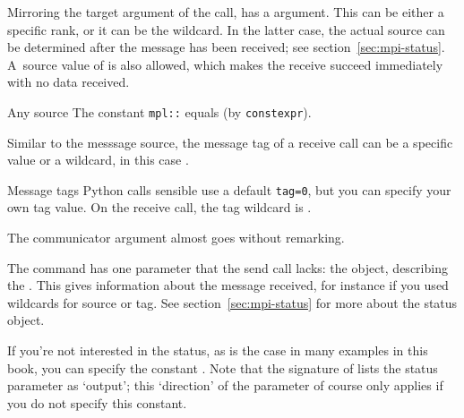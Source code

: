 Mirroring the target argument of the  call,
 has a 
argument.
This can be either a specific rank, or it can be the
 wildcard. In the latter case, the actual
source can be determined after the message has been received;
see section~\ref{sec:mpi-status}.
A~source value of  is also allowed,
which makes the receive succeed immediately with no data received.

\begin{mplnote}{Any source}
  The constant \lstinline+mpl::+
  equals  (by \lstinline+constexpr+).
\end{mplnote}

Similar to the messsage source, the message tag of a receive call can
be a specific value or a wildcard, in this case
.

\begin{pythonnote}{Message tags}
  Python calls sensible use a default \lstinline{tag=0},
  but you can specify your own tag value.
  On the receive call, the tag wildcard is .
\end{pythonnote}

The communicator argument almost goes without remarking.

The  command has one parameter that
the send call lacks: the  object,
describing the .
This gives information about the message received,
for instance if you used wildcards for source or tag.
See section~\ref{sec:mpi-status}
for more about the status object.

\begin{remark}
  If you're not interested in the status,
  as is the case in many examples in this book,
  you can specify the constant .
  Note that the signature of  lists the status parameter
  as `output'; this `direction' of the parameter of course only applies
  if you do not specify this constant.
\end{remark}

